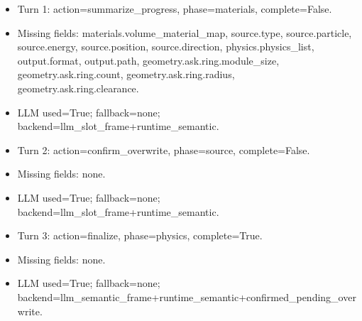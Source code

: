 \documentclass[11pt]{ctexart}
\begin{document}
\begin{itemize}
\item Turn 1: action=summarize\_progress, phase=materials, complete=False.
\item Missing fields: materials.volume\_material\_map, source.type, source.particle, source.energy, source.position, source.direction, physics.physics\_list, output.format, output.path, geometry.ask.ring.module\_size, geometry.ask.ring.count, geometry.ask.ring.radius, geometry.ask.ring.clearance.
\item LLM used=True; fallback=none; backend=llm\_slot\_frame+runtime\_semantic.
\item Turn 2: action=confirm\_overwrite, phase=source, complete=False.
\item Missing fields: none.
\item LLM used=True; fallback=none; backend=llm\_slot\_frame+runtime\_semantic.
\item Turn 3: action=finalize, phase=physics, complete=True.
\item Missing fields: none.
\item LLM used=True; fallback=none; backend=llm\_semantic\_frame+runtime\_semantic+confirmed\_pending\_overwrite.
\end{itemize}
\end{document}
